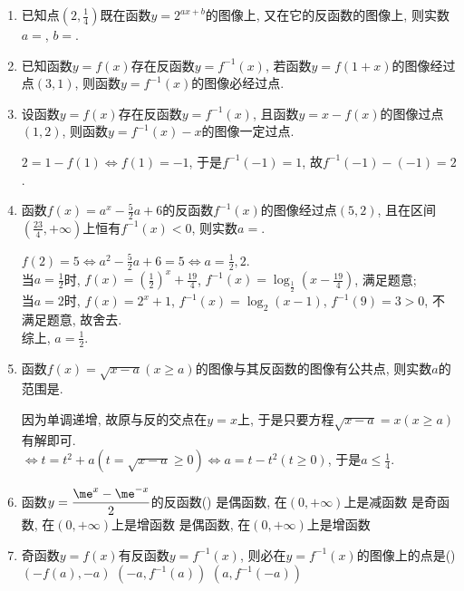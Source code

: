 \begin{enumerate}
\item 已知点$(2,\frac{1}{4})$既在函数$y=2^{ax+b}$的图像上, 又在它的反函数的图像上, 则实数$a=$, $b=$. 

\item 已知函数$y=f(x)$存在反函数$y=f^{-1}(x)$, 若函数$y=f(1+x)$的图像经过点$(3,1)$, 则函数$y=f^{-1}(x)$的图像必经过点. 

\item 设函数$y=f(x)$存在反函数$y=f^{-1}(x)$, 且函数$y=x-f(x)$的图像过点$(1,2)$, 则函数$y=f^{-1}(x)-x$的图像一定过点. 
\begin{jieda}
$2=1-f(1)\iff f(1)=-1$, 于是$f^{-1}(-1)=1$, 故$f^{-1}(-1)-(-1)=2$. 
\end{jieda}

\item 函数$f(x)=a^x-\frac{5}{2}a+6$的反函数$f^{-1}(x)$的图像经过点$(5,2)$, 且在区间$(\frac{23}{4},+\infty)$上恒有$f^{-1}(x)<0$, 则实数$a=$. 
\begin{jieda}
$f(2)=5\iff a^2-\frac{5}{2}a+6=5\iff a=\frac{1}{2},2$. \\
当$a=\frac{1}{2}$时, $f(x)=(\frac{1}{2})^x+\frac{19}{4}$, $f^{-1}(x)=\log_{\frac{1}{2}}(x-\frac{19}{4})$, 满足题意; \\
当$a=2$时, $f(x)=2^x+1$, $f^{-1}(x)=\log_2(x-1)$, $f^{-1}(9)=3>0$, 不满足题意, 故舍去. \\
综上, $a=\frac{1}{2}$. 
\end{jieda}


\item 函数$f(x)=\sqrt{x-a}(x\geq a)$的图像与其反函数的图像有公共点, 则实数$a$的范围是. 
\begin{jieda}
因为单调递增, 故原与反的交点在$y=x$上, 于是只要方程$\sqrt{x-a}=x(x\geq a)$有解即可. \\
$\iff t=t^2+a(t=\sqrt{x-a}\geq 0)\iff a=t-t^2(t\geq 0)$, 于是$a\leq\frac{1}{4}$. 
\end{jieda}

\item 函数$y=\dfrac{\me^x-\me^{-x}}{2}$的反函数\dotfill() 
{是偶函数, 在$(0,+\infty)$上是减函数}
{是奇函数, 在$(0,+\infty)$上是增函数}
{是偶函数, 在$(0,+\infty)$上是增函数}


\item 奇函数$y=f(x)$有反函数$y=f^{-1}(x)$, 则必在$y=f^{-1}(x)$的图像上的点是\dotfill()
{$(-f(a),-a)$}
{$(-a,f^{-1}(a))$}
{$(a,f^{-1}(-a))$}



\end{enumerate}
